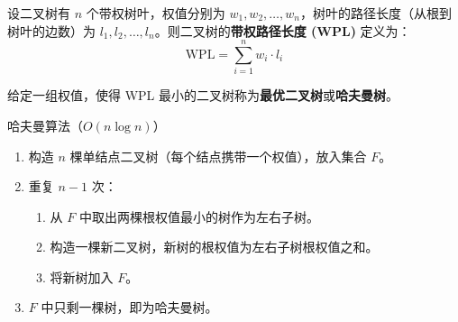 \begin{mydefinition}{}
设二叉树有 $n$ 个带权树叶，权值分别为 $w_1, w_2, \dots, w_n$，树叶的路径长度（从根到树叶的边数）为 $l_1, l_2, \dots, l_n$。则二叉树的\textbf{带权路径长度 (WPL)} 定义为：
\[
\boxed{\text{WPL} = \sum_{i=1}^{n} w_i \cdot l_i}
\]
\end{mydefinition}

\begin{mydefinition}{}
给定一组权值，使得 WPL 最小的二叉树称为\textbf{最优二叉树}或\textbf{哈夫曼树}。
\end{mydefinition}

\begin{myalgorithm}{哈夫曼算法（$O(n \log n)$）}
\begin{enumerate}
    \item 构造 $n$ 棵单结点二叉树（每个结点携带一个权值），放入集合 $F$。
    \item 重复 $n-1$ 次：
    \begin{enumerate}
        \item 从 $F$ 中取出两棵根权值最小的树作为左右子树。
        \item 构造一棵新二叉树，新树的根权值为左右子树根权值之和。
        \item 将新树加入 $F$。
    \end{enumerate}
    \item $F$ 中只剩一棵树，即为哈夫曼树。
\end{enumerate}
\end{myalgorithm}

